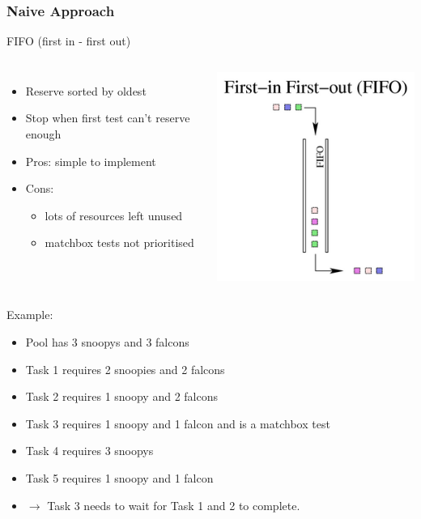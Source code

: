 \documentclass[xcolor=pdftex,dvipsnames,table]{beamer}
\begin{document}
\begin{frame}
\frametitle{Naive Approach}
FIFO (first in - first out)
\begin{columns}[cc]
\column{2.0in}
\begin{itemize}
  \item Reserve sorted by oldest
  \item Stop when first test can't reserve enough
  \item Pros: simple to implement
  \item Cons: 
    \begin{itemize}
      \item lots of resources left unused
      \item matchbox tests not prioritised
    \end{itemize}
\end{itemize}
\column{0.5in}
\includegraphics[scale=0.33]{fifo.png}
\end{columns}
\end{frame}

\begin{frame}
Example:
\begin{itemize}
  \item Pool has 3 snoopys and 3 falcons
  \item Task 1 requires 2 snoopies and 2 falcons
  \item Task 2 requires 1 snoopy and 2 falcons
  \item Task 3 requires 1 snoopy and 1 falcon and is a matchbox test
  \item Task 4 requires 3 snoopys
  \item Task 5 requires 1 snoopy and 1 falcon
  \item $\rightarrow$ Task 3 needs to wait for Task 1 and 2 to complete.
\end{itemize}
\end{frame}
\end{document}
